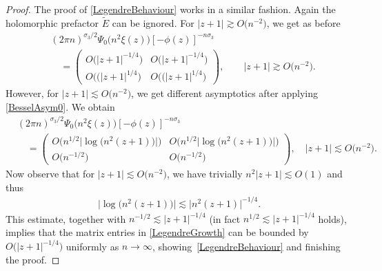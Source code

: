 \begin{proof}
The proof of \eqref{LegendreBehaviour} works in a similar fashion. Again the holomorphic prefactor $\widetilde E$ can be ignored. For $|z+1|\gtrsim O\big(n^{-2}\big)$, we get as before
\begin{align*}
& (2\pi n)^{\sigma_3/2}\Psi_0\big(n^2 \xi(z)\big)[-\phi(z)]^{-n\sigma_3}
 \\
 &\quad=\begin{pmatrix}
 O\big(|z+1|^{-1/4}\big) & O\big(|z+1|^{-1/4}\big)
 \\
 O\big((|z+1|^{1/4}\big) & O\big((|z+1|^{1/4}\big)
 \end{pmatrix}, \qquad |z+1| \gtrsim O\big(n^{-2}\big).
\end{align*}
However, for $|z+1|\lesssim O\big(n^{-2}\big)$, we get different asymptotics after applying \eqref{BesselAsym0}. We obtain%
\begin{align} \nonumber
 &(2\pi n)^{\sigma_3/2}\Psi_0\big(n^2 \xi(z)\big) [-\phi(z)]^{-n\sigma_3}
 \\\label{LegendreGrowth}
 &\quad= \begin{pmatrix}
 O\big(n^{1/2} \big|\log\big(n^2(z+1)\big)\big|\big) & O\big(n^{1/2} \big|\log \big(n^2(z+1)\big)\big|\big)
 \\
 O\big(n^{-1/2}\big) & O\big(n^{-1/2}\big)
 \end{pmatrix}, \quad |z+1|\lesssim O\big(n^{-2}\big).
\end{align}
Now observe that for $|z+1|\lesssim O\big(n^{-2}\big)$, we have trivially $n^2|z+1|\lesssim O(1)$ and thus
\begin{align*}
 \big|\log\big(n^2(z+1)\big)\big| \lesssim \big|n^2(z+1)\big|^{-1/4}.
\end{align*}
This estimate, together with $n^{-1/2} \lesssim |z+1|^{-1/4}$ \big(in fact $n^{1/2} \lesssim |z+1|^{-1/4}$ holds\big), implies that the matrix entries in \eqref{LegendreGrowth} can be bounded by $O\big(|z+1|^{-1/4}\big)$ uniformly as $n \to \infty$, showing~\eqref{LegendreBehaviour} and finishing the proof.
\end{proof}

